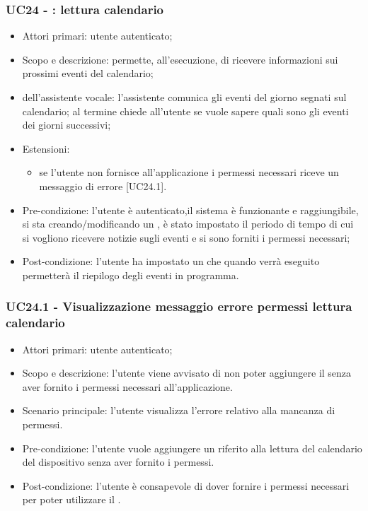 \subsubsection{UC24 - : lettura calendario}
\begin{itemize}
	\item  Attori primari: utente autenticato;
	\item  Scopo e descrizione: permette, all'esecuzione, di ricevere informazioni sui prossimi eventi del calendario;
	\item  {} dell'assistente vocale: l'assistente comunica gli eventi del giorno segnati sul calendario; al termine chiede all'utente se vuole sapere quali sono gli eventi dei giorni successivi;
	\item  Estensioni: 
		   \begin{itemize}
				\item se l'utente non fornisce all'applicazione i permessi necessari riceve un messaggio di errore [UC24.1].
		   \end{itemize}
	\item  Pre-condizione: l'utente è autenticato,il sistema è funzionante e raggiungibile, si sta creando/modificando un , è stato impostato il periodo di tempo di cui si vogliono ricevere notizie sugli eventi e si sono forniti i permessi necessari;
	\item  Post-condizione: l'utente ha impostato un  che quando verrà eseguito permetterà il riepilogo degli eventi in programma.
\end{itemize}
\subsubsection{UC24.1 - Visualizzazione messaggio errore permessi lettura calendario}
\begin{itemize}
	\item  Attori primari: utente autenticato;
	\item  Scopo e descrizione: l'utente viene avvisato di non poter aggiungere il  senza aver fornito i permessi necessari all'applicazione.
	\item  Scenario principale: l'utente visualizza l'errore relativo alla mancanza di permessi.
	\item  Pre-condizione: l'utente vuole aggiungere un  riferito alla lettura del calendario del dispositivo  senza aver fornito i permessi.
	\item  Post-condizione: l'utente è consapevole di dover fornire i permessi necessari per poter utilizzare il .
\end{itemize}
